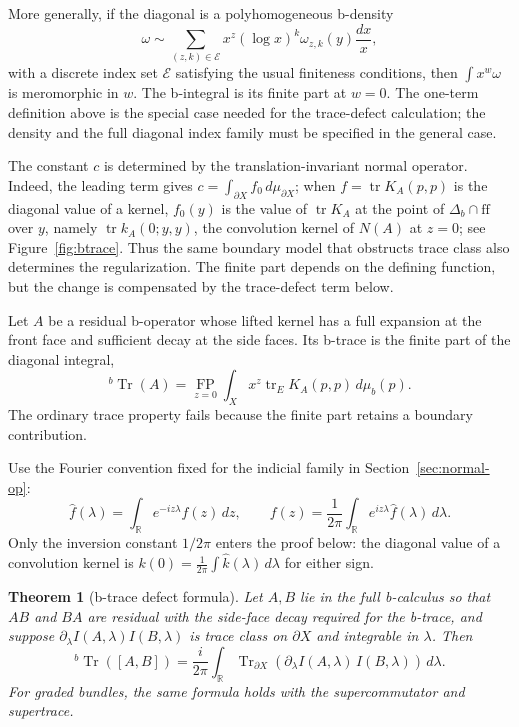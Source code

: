 \documentclass[12pt,oneside,reqno]{article}
\DeclareMathOperator{\Tr}{Tr}
\theoremstyle{plain}
\newtheorem{theorem}{Theorem}[section]
\theoremstyle{definition}
\theoremstyle{remark}
\begin{document}
More generally, if the diagonal is a polyhomogeneous b-density
\[
 \omega\sim
 \sum_{(z,k)\in\mathcal E}x^z(\log x)^k\omega_{z,k}(y)\frac{dx}{x},
\]
with a discrete index set \(\mathcal E\) satisfying the usual finiteness
conditions, then \(\int x^w\omega\) is meromorphic in \(w\). The
b-integral is its finite part at \(w=0\). The one-term definition above is
the special case needed for the trace-defect calculation; the density and
the full diagonal index family must be specified in the general case.

The constant \(c\) is determined by the translation-invariant normal
operator.  Indeed, the leading term gives \(c=\int_{\partial X}f_0\,
d\mu_{\partial X}\); when \(f=\operatorname{tr}K_A(p,p)\) is the diagonal
value of a kernel, \(f_0(y)\) is the value of
\(\operatorname{tr}K_A\) at the point of \(\Delta_b\cap\mathrm{ff}\) over
\(y\), namely \(\operatorname{tr}k_A(0;y,y)\), the convolution kernel of
\(N(A)\) at \(z=0\); see Figure~\ref{fig:btrace}.  Thus the same boundary model that obstructs trace class also
determines the regularization.  The finite part depends on the defining
function, but the change is compensated by the trace-defect term below.

Let \(A\) be a residual b-operator whose lifted kernel has a full expansion
at the front face and sufficient decay at the side faces. Its b-trace is the
finite part of the diagonal integral,
\[
 {}^b\Tr(A)
 =
 \operatorname*{FP}_{z=0}
 \int_X x^z\operatorname{tr}_E K_A(p,p)\,d\mu_b(p).
\]
The ordinary trace property fails because the finite part retains a
boundary contribution.

Use the Fourier convention fixed for the indicial family in
Section~\ref{sec:normal-op}:
\[
 \widehat f(\lambda)=\int_{\mathbb R}e^{-iz\lambda}f(z)\,dz,
 \qquad
 f(z)=\frac1{2\pi}\int_{\mathbb R}e^{iz\lambda}
 \widehat f(\lambda)\,d\lambda.
\]
Only the inversion constant \(1/2\pi\) enters the proof below: the
diagonal value of a convolution kernel is
\(k(0)=\frac1{2\pi}\int\widehat k(\lambda)\,d\lambda\) for either sign.

\begin{theorem}[b-trace defect formula]
Let \(A,B\) lie in the full b-calculus so that \(AB\) and \(BA\) are
residual with the side-face decay required for the b-trace, and suppose
\(\partial_\lambda I(A,\lambda)I(B,\lambda)\) is trace class on
\(\partial X\) and integrable in \(\lambda\). Then
\[
 {}^b\Tr([A,B])
 =
 \frac{i}{2\pi}
 \int_{\mathbb R}
 \Tr_{\partial X}
 \left(
 \partial_\lambda I(A,\lambda)\,I(B,\lambda)
 \right)\,d\lambda.
\]
For graded bundles, the same formula holds with the supercommutator and
supertrace.
\end{theorem}
\end{document}
